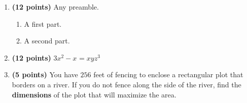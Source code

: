 \documentclass[12pt]{amsart}
\begin{document}
\begin{enumerate}
\vfill 
\def \a{7}\def \atwoone{1}\def \atwotwo{-2}\def \atwothree{2}\def \btwothree{7}\def \sumtwothree{9}\def \diftwothree{-5}\def \bigtwothree{200}\def \powtwothree{49}\def \logtwothree{0.3562071871080222}\def \factortwothree{65}\def \atwofour{1.74}\def \btwofour{1.749}\def \tooshorttwofour{10.1}\def \moneytwofour{10.10}\def \longertwofour{10.10000}\def \atwofive{0.12}\def \btwofive{0.12346}\def \athreeone{4}\def \bthreeone{3}\def \setthreetwo{[3, 7, 7]}\def \athreetwo{3}\def \bthreetwo{7}\def \cthreetwo{7}\def \controlthreethree{-8}\def \athreethree{3}\def \topthreethree{1}\def \athreefour{4}\def \bthreefour{3}\def \listthreefour{[1, 2, 3, 5]}\def \afourone{16}\def \bfourone{-6}\def \fracfourone{\frac{-8}{3}}\def \rootfourtwo{8}\def \simplifiedfourtwo{2 \sqrt{2}}\def \sqrtlistfourtwo{[2, 2]}\def \outfourtwo{2}\def \infourtwo{2}\def \wowfourtwo{1}\def \afourthree{0}\def \nicethreefour{3x^{2}-x^{}}\def \nastythreefour{xyz^{3}}\def \cfourthree{-4}\def \dfourthree{9}\def \infourthree{-4x^{}}\def \outfourthree{+9y^{}}\def \afourfour{1447883}\def \nicefourfour{1,447,883}\def \goodfourfour{1,000,000.12345}\def \badfourfour{1,000,000.1}
\item {\bf (12 points)} 
 Any preamble. \begin{enumerate}
\item A first part. \vspace{2cm}
\item A second part.
\end{enumerate}

\vfill 
\def \a{7}\def \atwoone{3}\def \atwotwo{-6}\def \atwothree{3}\def \btwothree{9}\def \sumtwothree{12}\def \diftwothree{-6}\def \bigtwothree{300}\def \powtwothree{729}\def \logtwothree{0.5}\def \factortwothree{39}\def \atwofour{1.27}\def \btwofour{1.706}\def \tooshorttwofour{10.1}\def \moneytwofour{10.10}\def \longertwofour{10.10000}\def \atwofive{0.12}\def \btwofive{0.12346}\def \athreeone{5}\def \bthreeone{7}\def \setthreetwo{[3, 7, 7]}\def \athreetwo{3}\def \bthreetwo{7}\def \cthreetwo{7}\def \controlthreethree{-4}\def \athreethree{3}\def \topthreethree{0}\def \athreefour{4}\def \bthreefour{5}\def \listthreefour{[1, 2, 3, 5]}\def \afourone{12}\def \bfourone{-8}\def \fracfourone{\frac{-3}{2}}\def \rootfourtwo{8}\def \simplifiedfourtwo{2 \sqrt{2}}\def \sqrtlistfourtwo{[2, 2]}\def \outfourtwo{2}\def \infourtwo{2}\def \wowfourtwo{1}\def \afourthree{0}\def \nicethreefour{3x^{2}-x^{}}\def \nastythreefour{xyz^{3}}\def \cfourthree{-4}\def \dfourthree{10}\def \infourthree{-4x^{}}\def \outfourthree{+10y^{}}\def \afourfour{1641647}\def \nicefourfour{1,641,647}\def \goodfourfour{1,000,000.12345}\def \badfourfour{1,000,000.1}
\item {\bf (12 points)} 
  $\nicethreefour = \nastythreefour$ 
\vfill 
\newpage\def \x{64}\def \y{128}\def \L{256}\def \area{8192}
\item {\bf (5 points)} 
 You have $\L$ feet of fencing to enclose a rectangular plot that borders on a river. If you do not fence along the side of the river, find the \textbf{dimensions} of the plot that will maximize the area. \\


\end{enumerate}
\end{document}
